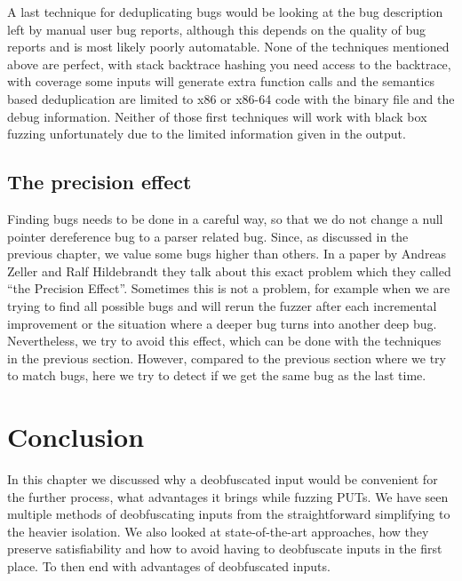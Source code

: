 A last technique for deduplicating bugs would be looking at the bug description left by manual user bug reports, although this depends on the quality of bug reports and is most likely poorly automatable.
None of the techniques mentioned above are perfect, with stack backtrace hashing you need access to the backtrace, with coverage some inputs will generate extra function calls and the semantics based deduplication are limited to x86 or x86-64 code with the binary file and the debug information. Neither of those first techniques will work with black box fuzzing unfortunately due to the limited information given in the output.

\subsection{The precision effect}
\label{inputReduction:PersisionEffect}
Finding bugs needs to be done in a careful way, so that we do not change a null pointer dereference bug to a parser related bug. Since, as discussed in the previous chapter, we value some bugs higher than others. 
In a paper by Andreas Zeller and Ralf Hildebrandt \cite{5zeller2002simplifyingIsolatingFailure-inducing} they talk about this exact problem which they called “the Precision Effect”. Sometimes this is not a problem, for example when we are trying to find all possible bugs and will rerun the fuzzer after each incremental improvement or the situation where a deeper bug turns into another deep bug. Nevertheless, we try to avoid this effect, which can be done with the techniques in the previous section. However, compared to the previous section where we try to match bugs, here we try to detect if we get the same bug as the last time.

\section{Conclusion}
\label{inputReduction:Conclusion}
In this chapter we discussed why a deobfuscated input would be convenient for the further process, what advantages it brings while fuzzing PUTs. We have seen multiple methods of deobfuscating inputs from the straightforward simplifying to the heavier isolation. We also looked at state-of-the-art approaches, how they preserve satisfiability and how to avoid having to deobfuscate inputs in the first place. To then end with advantages of deobfuscated inputs.

